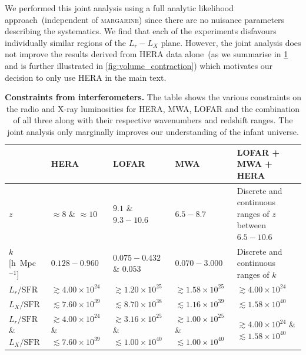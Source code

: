 We performed this joint analysis using a full analytic likelihood approach~(independent of \textsc{margarine}) since there are no nuisance parameters describing the systematics. We find that each of the experiments disfavours individually similar regions of the $L_r - L_X$ plane. However, the joint analysis does not improve the results derived from HERA data alone~(as we summarise in \cref{tab:interferometers} and is further illustrated in \cref{fig:volume_contraction}) which motivates our decision to only use HERA in the main text. 

\begin{table}[]
    \centering
    \begin{tabular}{|p{2cm}|p{3cm}|p{3cm}|p{3cm}|p{3cm}|}
        \hline
         & HERA  & LOFAR & MWA & LOFAR + MWA + HERA \\
         \hline
         $z$ & $\approx 8$ \&  $\approx 10$ & $9.1$ \&  $ 9.3 - 10.6$ & $6.5 - 8.7$ & Discrete and continuous ranges of $z$ between $6.5 - 10.6$ \\
         \hline
         $k$ [h~Mpc$^{-1}$]& $0.128 - 0.960$  & $0.075 - 0.432$ \&  $0.053$& $0.070-3.000$ & Discrete and continuous ranges of $k$ \\
         \hline
         \hline
         $L_{r}/\mathrm{SFR}$ & $\gtrsim4.00\times10^{24}$ & $\gtrsim 1.20 \times10^{25}$ & $\gtrsim1.58\times10^{25}$ & $\gtrsim4.00\times10^{24}$ \\
         \hline
         $L_{X}/\mathrm{SFR}$ & $\lesssim7.60\times10^{39}$ & $\lesssim 8.70 \times10^{38}$ & $\lesssim1.16\times10^{39}$ & $\lesssim 1.58 \times10^{40}$\\
         \hline
         $L_{r}/\mathrm{SFR}$ \&  $L_{X}/\mathrm{SFR}$ & $\gtrsim 4.00\times10^{24}$ \&  $\lesssim 7.60\times10^{39}$ & $\gtrsim 3.16\times10^{25}$ \&  $\lesssim 1.00\times10^{40}$ & $\gtrsim 1.00\times10^{25}$ \&  $\lesssim 1.00\times10^{40}$ & $\gtrsim4.00\times10^{24}$ \&  $\lesssim1.58 \times10^{40}$ \\
         \hline
    \end{tabular}
    \caption{\textbf{Constraints from interferometers.} The table shows the various constraints on the radio and X-ray luminosities for HERA, MWA, LOFAR and the combination of all three along with their respective wavenumbers and redshift ranges. The joint analysis only marginally improves our understanding of the infant universe.}
    \label{tab:interferometers}
\end{table}

